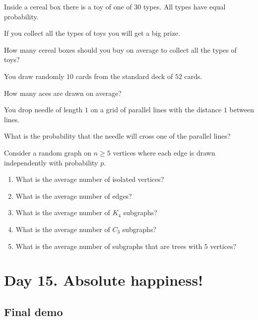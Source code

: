\documentclass[12pt]{article}
\begin{document}
\begin{exercise}
Inside a cereal box there is a toy of one of $30$ types. 
All types have equal probability. 

If you collect all the types of toys you will get a big prize. 
    
How many cereal boxes should you buy on average to collect all the types of toys?
\end{exercise}

\begin{exercise}
You draw randomly $10$ cards from the standard deck of $52$ cards.

How many aces are drawn on average?
\end{exercise}

\begin{exercise}
You drop needle of length $1$ on a grid of parallel lines with the distance $1$ between lines. 

What is the probability that the needle will cross one of the parallel lines?
\end{exercise}

\begin{exercise}
Consider a random graph on $n \geq 5$ vertices where each edge is drawn independently with probability $p$.

\begin{enumerate}[label=\alph*)]
  \item What is the average number of isolated vertices?
  \item What is the average number of edges?
  \item What is the average number of $K_4$ subgraphs?
  \item What is the average number of $C_3$ subgraphs?
  \item What is the average number of subgraphs that are trees with $5$ vertices?
\end{enumerate}

\end{exercise}



\section{Day 15. Absolute happiness! }

\subsection*{Final demo}
\end{document}
